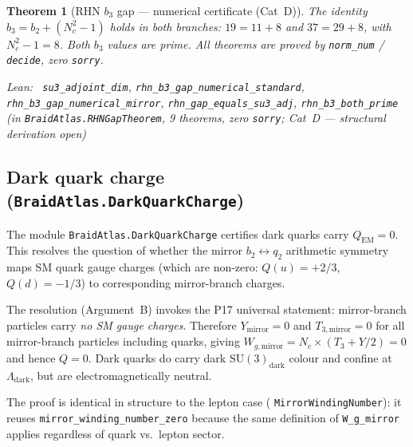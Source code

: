 \documentclass[11pt,a4paper]{article}
\newenvironment{leanref}%
  {\par\smallskip\noindent\begingroup\raggedright\textup{Lean:}~}%
  {\par\endgroup}
\newtheorem{theorem}{Theorem}[section]
\theoremstyle{definition}
\begin{document}
\begin{theorem}[RHN $b_3$ gap --- numerical certificate (Cat~D)]\label{thm:rhn_gap}
The identity $b_3 = b_2 + (N_c^2 - 1)$ holds in both branches:
$19 = 11 + 8$ and $37 = 29 + 8$, with $N_c^2 - 1 = 8$.
Both $b_3$ values are prime.
All theorems are proved by \lstinline|norm_num| / \lstinline|decide|,
zero \texttt{sorry}.
\begin{leanref}
\lstinline|su3_adjoint_dim|,
\lstinline|rhn_b3_gap_numerical_standard|,
\lstinline|rhn_b3_gap_numerical_mirror|,
\lstinline|rhn_gap_equals_su3_adj|,
\lstinline|rhn_b3_both_prime|
\textup{(in \texttt{BraidAtlas.RHNGapTheorem}, 9 theorems, zero \texttt{sorry};
Cat~D — structural derivation open)}
\end{leanref}
\end{theorem}

\subsection{Dark quark charge (\texttt{BraidAtlas.DarkQuarkCharge})}
\label{subsec:dark_quark_charge_lean}

The module \texttt{BraidAtlas.DarkQuarkCharge} certifies dark quarks
carry $Q_\mathrm{EM} = 0$.  This resolves the question of whether the mirror
$b_2 \leftrightarrow q_2$ arithmetic symmetry maps SM quark gauge charges
(which are non-zero: $Q(u) = +2/3$, $Q(d) = -1/3$) to corresponding
mirror-branch charges.

The resolution (Argument~B) invokes the P17 universal statement: mirror-branch
particles carry \emph{no SM gauge charges}.  Therefore $Y_\mathrm{mirror} = 0$
and $T_{3,\mathrm{mirror}} = 0$ for all mirror-branch particles including quarks,
giving $W_{g,\mathrm{mirror}} = N_c \times (T_3 + Y/2) = 0$ and hence $Q = 0$.
Dark quarks do carry dark $\mathrm{SU}(3)_{\mathrm{dark}}$ colour and confine at
$\Lambda_\mathrm{dark}$, but are electromagnetically neutral.

The proof is identical in structure to the lepton case (
\texttt{MirrorWindingNumber}): it reuses \lstinline|mirror_winding_number_zero|
because the same definition of \lstinline|W_g_mirror| applies regardless of
quark vs.\ lepton sector.
\end{document}
